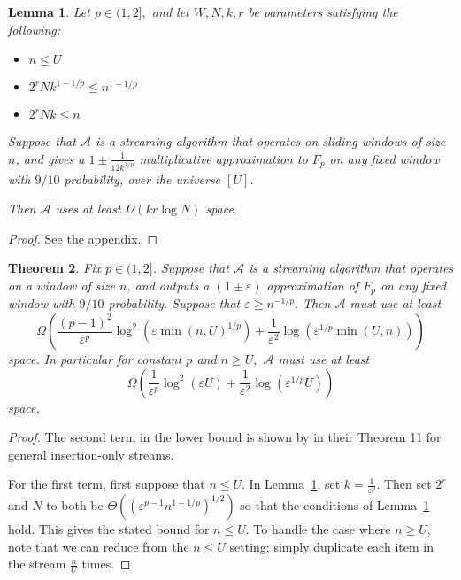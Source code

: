 \documentclass{article}
\newcommand{\eps}{\varepsilon}
\theoremstyle{plain}
\newtheorem{theorem}{Theorem}[section]
\newtheorem{lem}[theorem]{Lemma}
\newcommand{\unisize}{U}
\newcommand{\window}{n}
\begin{document}
\begin{lem}
\label{lem:main_lower_bound}
Let $p\in (1,2],$ and let $W, N, k, r$ be parameters satisfying the following:
\begin{itemize}
\item $\window \leq \unisize$
\item $2^r N k^{1 - 1/p} \leq \window^{1-1/p}$
\item $2^r Nk \leq \window$
\end{itemize}
Suppose that $\mathcal{A}$ is a streaming algorithm that operates on sliding windows of size $\window$, and gives a $1 \pm \frac{1}{12 k^{1/p}}$ multiplicative approximation to $F_p$ on any fixed window with $9/10$ probability, over the universe $[\unisize]$.

Then $\mathcal{A}$ uses at least $\Omega(kr\log N)$ space.
\end{lem}

\begin{proof}
See the appendix.
\end{proof}
\begin{theorem}
Fix $p \in (1,2]$. Suppose that $\mathcal{A}$ is a streaming algorithm that operates on a window of size $\window$, and outputs a $(1\pm \eps)$ approximation of $F_p$ on any fixed window with $9/10$ probability. Suppose that $\eps \geq n^{-1/p}.$ Then $\mathcal{A}$ must use at least \[
\Omega\left(\frac{(p-1)^2}{\eps^p}\log^2(\eps \min(\window,\unisize)^{1/p})
+ \frac{1}{\eps^2}\log(\eps^{1/p} \min(\unisize, \window))
\right)
\]space.  In particular for constant $p$ and $\window \geq \unisize,$ $\mathcal{A}$ must use at least \[\Omega\left(\frac{1}{\eps^p}\log^2(\eps \unisize) + \frac{1}{\eps^2}\log(\eps^{1/p} \unisize)\right)\] space.
\end{theorem}
\begin{proof}

The second term in the lower bound is shown by \cite{braverman2024optimality} in their Theorem 11 for general insertion-only streams.

For the first term, first suppose that $\window \leq \unisize.$ In Lemma~\ref{lem:main_lower_bound}, set $k = \frac{1}{\eps^p}$.  Then set $2^r$ and $N$ to both be $\Theta((\eps^{p-1}n^{1 - 1/p})^{1/2})$ so that the conditions of Lemma~\ref{lem:main_lower_bound} hold.  This gives the stated bound for $\window \leq \unisize.$ To handle the case where $\window \geq \unisize$, note that we can reduce from the $\window \leq \unisize$ setting; simply duplicate each item in the stream $\frac{\window}{\unisize}$ times.
\end{proof}
 
\end{document}
